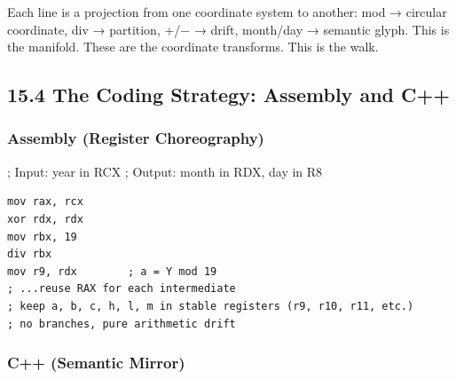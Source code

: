 Each line is a projection from one coordinate system to another: mod →
circular coordinate, div → partition, +/− → drift, month/day → semantic
glyph. This is the manifold. These are the coordinate transforms. This
is the walk.

\hypertarget{the-coding-strategy-assembly-and-c}{%
\subsection{15.4 The Coding Strategy: Assembly and
C++}\label{the-coding-strategy-assembly-and-c}}

\hypertarget{assembly-register-choreography}{%
\subsubsection{Assembly (Register
Choreography)}\label{assembly-register-choreography}}

; Input: year in RCX ; Output: month in RDX, day in R8

\begin{verbatim}
mov rax, rcx
xor rdx, rdx
mov rbx, 19
div rbx
mov r9, rdx        ; a = Y mod 19
; ...reuse RAX for each intermediate
; keep a, b, c, h, l, m in stable registers (r9, r10, r11, etc.)
; no branches, pure arithmetic drift
\end{verbatim}

\hypertarget{c-semantic-mirror}{%
\subsubsection{C++ (Semantic Mirror)}\label{c-semantic-mirror}}

